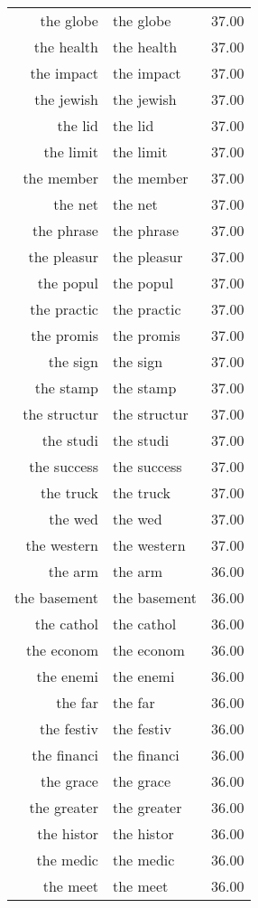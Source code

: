 \begin{table}[ht]
\begin{tabular}{rlr}
  the globe & the globe & 37.00 \\ 
  the health & the health & 37.00 \\ 
  the impact & the impact & 37.00 \\ 
  the jewish & the jewish & 37.00 \\ 
  the lid & the lid & 37.00 \\ 
  the limit & the limit & 37.00 \\ 
  the member & the member & 37.00 \\ 
  the net & the net & 37.00 \\ 
  the phrase & the phrase & 37.00 \\ 
  the pleasur & the pleasur & 37.00 \\ 
  the popul & the popul & 37.00 \\ 
  the practic & the practic & 37.00 \\ 
  the promis & the promis & 37.00 \\ 
  the sign & the sign & 37.00 \\ 
  the stamp & the stamp & 37.00 \\ 
  the structur & the structur & 37.00 \\ 
  the studi & the studi & 37.00 \\ 
  the success & the success & 37.00 \\ 
  the truck & the truck & 37.00 \\ 
  the wed & the wed & 37.00 \\ 
  the western & the western & 37.00 \\ 
  the arm & the arm & 36.00 \\ 
  the basement & the basement & 36.00 \\ 
  the cathol & the cathol & 36.00 \\ 
  the econom & the econom & 36.00 \\ 
  the enemi & the enemi & 36.00 \\ 
  the far & the far & 36.00 \\ 
  the festiv & the festiv & 36.00 \\ 
  the financi & the financi & 36.00 \\ 
  the grace & the grace & 36.00 \\ 
  the greater & the greater & 36.00 \\ 
  the histor & the histor & 36.00 \\ 
  the medic & the medic & 36.00 \\ 
  the meet & the meet & 36.00 \\ 

\end{tabular}
\end{table}
